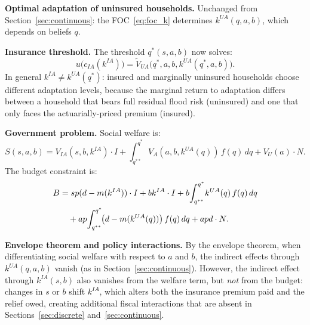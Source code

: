 \documentclass{article}
\begin{document}
\textbf{Optimal adaptation of uninsured households.} Unchanged from Section~\ref{sec:continuous}: the FOC~\eqref{eq:foc_k} determines $k^{UA}(q,a,b)$, which depends on beliefs $q$.

\textbf{Insurance threshold.} The threshold $q^*(s,a,b)$ now solves:
\begin{equation}
    u\!\bigl(c_{IA}(k^{IA})\bigr) = \tilde{V}_{UA}\!\bigl(q^*, a, b, k^{UA}(q^*,a,b)\bigr). \label{eq:qstar_cont_premium}
\end{equation}
In general $k^{IA} \neq k^{UA}(q^*)$: insured and marginally uninsured households choose different adaptation levels, because the marginal return to adaptation differs between a household that bears full residual flood risk (uninsured) and one that only faces the actuarially-priced premium (insured).

\textbf{Government problem.} Social welfare is:
\begin{equation}
    S(s,a,b) = V_{IA}(s,b,k^{IA})\cdot I
    + \int_{q^{**}}^{q^*} V_A(a,b,k^{UA}(q))\,f(q)\,dq
    + V_U(a)\cdot N. \label{eq:welfare_premium_cont}
\end{equation}
The budget constraint is:
\begin{align}
    B &= sp(d-m(k^{IA}))\cdot I
    + bk^{IA}\cdot I
    + b\!\int_{q^{**}}^{q^*}\! k^{UA}(q)\,f(q)\,dq
    \notag\\
    &\quad + ap\!\int_{q^{**}}^{q^*}\!\bigl(d-m(k^{UA}(q))\bigr)\,f(q)\,dq
    + apd\cdot N. \label{eq:budget_premium_cont}
\end{align}

\textbf{Envelope theorem and policy interactions.} By the envelope theorem, when differentiating social welfare with respect to $a$ and $b$, the indirect effects through $k^{UA}(q,a,b)$ vanish (as in Section~\ref{sec:continuous}). However, the indirect effect through $k^{IA}(s,b)$ also vanishes from the welfare term, but \emph{not} from the budget: changes in $s$ or $b$ shift $k^{IA}$, which alters both the insurance premium paid and the relief owed, creating additional fiscal interactions that are absent in Sections~\ref{sec:discrete} and~\ref{sec:continuous}.
\end{document}

